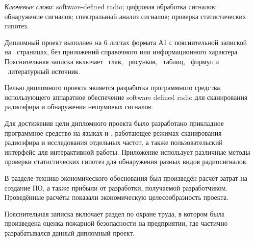 \thispagestyle{empty}

\emph{Ключевые слова}: software-defined radio; цифровая обработка сигналов; обнаружение сигналов; спектральный анализ сигналов; проверка статистических гипотез.

\vspace{4\parsep}

Дипломный проект выполнен на 6 листах формата А1 с пояснительной запиской на~\pageref*{LastPage} страницах, без приложений справочного или информационного характера. 
Пояснительная записка включает ~глав, \totfig{}~рисунков, \tottab{}~таблиц, \toteq{}~формул и \totref{}~литературный источник.

Целью дипломного проекта является разработка программного средства, использующего аппаратное обеспечение software defined radio для сканирования радиоэфира и обнаружения нешумовых сигналов.

Для достижения цели дипломного проекта было разработано прикладное программное средство на языках \python{} и \purec{}, работающее режимах сканирования радиоэфира и исследования отдельных частот, а также пользовательский интерфейс для интерактивной работы.
Приложение использует различные методы проверки статистических гипотез для обнаружения разных видов радиосигналов.

В разделе технико-экономического обоснования был произведён расчёт затрат на создание ПО, а также прибыли от разработки, получаемой разработчиком.
Проведённые расчёты показали экономическую целесообразность проекта.

Пояснительная записка включает раздел по охране труда, в котором была произведена оценка пожарной безопасности на предприятии, где частично разрабатывался данный дипломный проект.

\clearpage